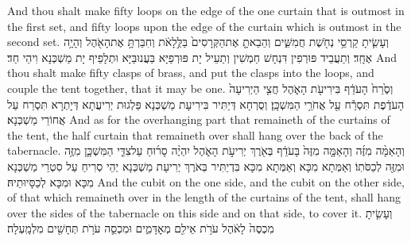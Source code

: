 {And thou shalt make fifty loops on the edge of the one curtain that is outmost in the first set, and fifty loops upon the edge of the curtain which is outmost in the second set.}{}
{וְעָשִׂ֛יתָ קַרְסֵ֥י נְחֹ֖שֶׁת חֲמִשִּׁ֑ים וְהֵבֵאתָ֤ אֶת\maqqaf הַקְּרָסִים֙ בַּלֻּ֣לָאֹ֔ת וְחִבַּרְתָּ֥ אֶת\maqqaf הָאֹ֖הֶל וְהָיָ֥ה אֶחָֽד׃}
{וְתַעֲבֵיד פּוּרְפִין דִּנְחָשׁ חַמְשִׁין וְתַעֵיל יָת פּוּרְפַיָּא בַּעֲנוּבַּיָּא וּתְלָפֵיף יָת מַשְׁכְּנָא וִיהֵי חַד׃}
{And thou shalt make fifty clasps of brass, and put the clasps into the loops, and couple the tent together, that it may be one.}{}
{וְסֶ֙רַח֙ הָעֹדֵ֔ף בִּירִיעֹ֖ת הָאֹ֑הֶל חֲצִ֤י הַיְרִיעָה֙ הָעֹדֶ֔פֶת תִּסְרַ֕ח עַ֖ל אֲחֹרֵ֥י הַמִּשְׁכָּֽן׃}
{וְסֻרְחָא דְּיַתִּיר בִּירִיעָת מַשְׁכְּנָא פַּלְגוּת יְרִיעֲתָא דְּיָתְרָא תִּסְרַח עַל אֲחוֹרֵי מַשְׁכְּנָא׃}
{And as for the overhanging part that remaineth of the curtains of the tent, the half curtain that remaineth over shall hang over the back of the tabernacle.}{}
{וְהָאַמָּ֨ה מִזֶּ֜ה וְהָאַמָּ֤ה מִזֶּה֙ בָּעֹדֵ֔ף בְּאֹ֖רֶךְ יְרִיעֹ֣ת הָאֹ֑הֶל יִהְיֶ֨ה סָר֜וּחַ עַל\maqqaf צִדֵּ֧י הַמִּשְׁכָּ֛ן מִזֶּ֥ה וּמִזֶּ֖ה לְכַסֹּתֽוֹ׃}
{וְאַמְּתָא מִכָּא וְאַמְּתָא מִכָּא בִּדְיַתִּיר בְּאֹרֶךְ יְרִיעָת מַשְׁכְּנָא יְהֵי סְרִיחַ עַל סִטְרֵי מַשְׁכְּנָא מִכָּא וּמִכָּא לְכַסָּיוּתֵיהּ׃}
{And the cubit on the one side, and the cubit on the other side, of that which remaineth over in the length of the curtains of the tent, shall hang over the sides of the tabernacle on this side and on that side, to cover it.}{}
{וְעָשִׂ֤יתָ מִכְסֶה֙ לָאֹ֔הֶל עֹרֹ֥ת אֵילִ֖ם מְאׇדָּמִ֑ים וּמִכְסֵ֛ה עֹרֹ֥ת תְּחָשִׁ֖ים מִלְמָֽעְלָה׃ \petucha }
